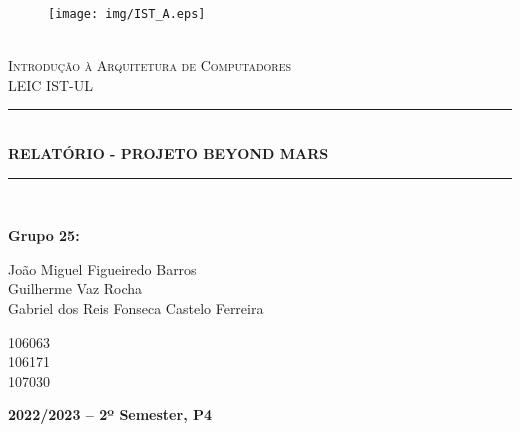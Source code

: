 \documentclass{article}
\newcommand{\HRule}[1]{\rule{\linewidth}{#1}}
\begin{document}
\begin{center}
    \begin{figure}
        \texttt{[image: img/IST\_A.eps]} %
        \end{figure}
    \LARGE{ \normalsize \textsc{} \\
    [2.0cm] 
    \LARGE{ \LARGE \textsc{Introdução à Arquitetura de Computadores}} \\
    [1cm]
    \LARGE{ \LARGE \textsc{LEIC IST-UL}} \\
    [1cm]
    \HRule{1.5pt} \\
    [0.4cm]
    \LARGE \textbf{\uppercase{Relatório - Projeto Beyond Mars}}
    \HRule{1.5pt}
    \\ [2.5cm]
    }
\end{center}

\begin{flushleft}
    \textbf{\LARGE Grupo 25:}
\end{flushleft}

\begin{center}
    \begin{minipage}{0.7\textwidth}
        \begin{flushleft}
            \large João Miguel Figueiredo Barros \\
            \large Guilherme Vaz Rocha \\
            \large Gabriel dos Reis Fonseca Castelo Ferreira 
        \end{flushleft}
    \end{minipage}%
    \begin{minipage}{0.3\textwidth}
        \begin{flushright}
            \large 106063\\
            \large 106171\\
            \large 107030
        \end{flushright}
    \end{minipage}
\end{center}

\begin{center}
    \vspace{4cm}
    \date \large \bf  2022/2023 -- 2º Semester, P4
\end{center}


\setcounter{page}{0}
\thispagestyle{empty}
\end{document}
